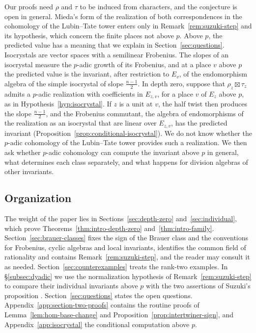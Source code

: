 \documentclass[a4paper,11pt]{amsart}
\theoremstyle{definition}
\theoremstyle{remark}
\numberwithin{equation}{section}
\begin{document}
Our proofs need $\rho$ and $\tau$ to be induced from characters, and the conjecture is open in general. Mieda's form of the realization of both correspondences in the cohomology of the Lubin--Tate tower \cite[Theorem~3.1]{Mie16} enters only in Remark~\ref{rem:suzuki-step} and its hypothesis, which concern the finite places not above $p$. Above $p$, the predicted value has a meaning that we explain in Section~\ref{sec:questions}. Isocrystals are vector spaces with a semilinear Frobenius. The slopes of an isocrystal measure the $p$-adic growth of its Frobenius, and at a place $v$ above $p$ the predicted value is the invariant, after restriction to $E_v$, of the endomorphism algebra of the simple isocrystal of slope $\frac{n-1}2$. In depth zero, suppose that $\rho_z\boxtimes\tau_z$ admits a $p$-adic realization with coefficients in $E_{z,v}$, for a place $v$ of $E_z$ above $p$, as in Hypothesis~\ref{hyp:isocrystal}. If $z$ is a unit at $v$, the half twist then produces the slope $\frac{n-1}2$, and the Frobenius commutant, the algebra of endomorphisms of the realization as an isocrystal that are linear over $E_{z,v}$, has the predicted invariant (Proposition~\ref{prop:conditional-isocrystal}). We do not know whether the $p$-adic cohomology of the Lubin--Tate tower provides such a realization. We then ask whether $p$-adic cohomology can compute the invariant above $p$ in general, what determines each class separately, and what happens for division algebras of other invariants.

\subsection{Organization}\label{subsec:intro-organization}

The weight of the paper lies in Sections~\ref{sec:depth-zero} and~\ref{sec:individual}, which prove Theorems~\ref{thm:intro-depth-zero} and~\ref{thm:intro-family}. Section~\ref{sec:brauer-classes} fixes the sign of the Brauer class and the conventions for Frobenius, cyclic algebras and local invariants, identifies the common field of rationality and contains Remark~\ref{rem:suzuki-step}, and the reader may consult it as needed. Section~\ref{sec:counterexamples} treats the rank-two examples. In \S\ref{subsec:dyadic} we use the normalization hypothesis of Remark~\ref{rem:suzuki-step} to compare their individual invariants above $p$ with the two assertions of Suzuki's proposition \cite[Proposition~4.0.13]{Su23}. Section~\ref{sec:questions} states the open questions. Appendix~\ref{app:section-two-proofs} contains the routine proofs of Lemma~\ref{lem:hom-base-change} and Proposition~\ref{prop:intertwiner-sign}, and Appendix~\ref{app:isocrystal} the conditional computation above $p$.
\end{document}
